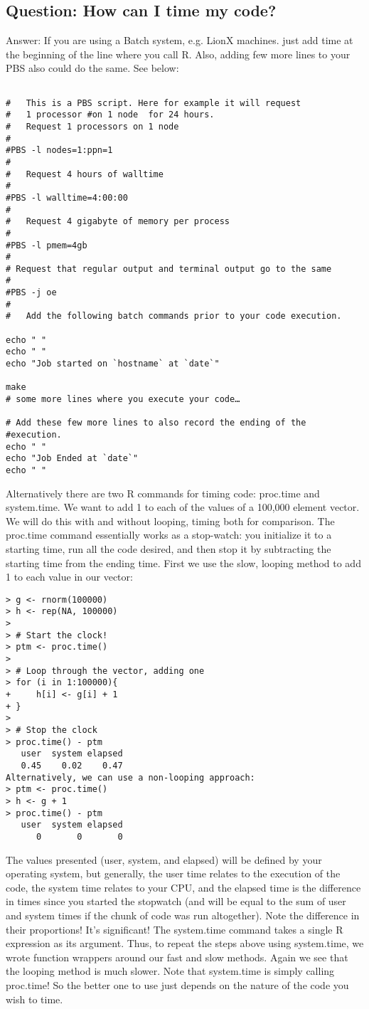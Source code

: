 \documentclass[12pt]{article}
\begin{document}
\subsection{Question: How can I time my code?}
Answer:
If you are using a Batch system, e.g. LionX machines. just add time at the beginning of the line where you call R.
Also, adding few more lines to your PBS also could do the same. See below:

\begin{verbatim}

#   This is a PBS script. Here for example it will request 
#   1 processor #on 1 node  for 24 hours.
#   Request 1 processors on 1 node 
#   
#PBS -l nodes=1:ppn=1
#
#   Request 4 hours of walltime
#
#PBS -l walltime=4:00:00
#
#   Request 4 gigabyte of memory per process
#
#PBS -l pmem=4gb
#
# Request that regular output and terminal output go to the same    
#
#PBS -j oe
#
#   Add the following batch commands prior to your code execution.     

echo " "
echo " "
echo "Job started on `hostname` at `date`"

make
# some more lines where you execute your code…

# Add these few more lines to also record the ending of the
#execution.
echo " "
echo "Job Ended at `date`"
echo " "
\end{verbatim}

Alternatively there are two R commands for timing code: proc.time and system.time. We want to add 1 to each of the values of a 100,000 element vector. We will do this with and without looping, timing both for comparison.
The proc.time command essentially works as a stop-watch: you initialize it to a starting time, run all the code desired, and then stop it by subtracting the starting time from the ending time.
First we use the slow, looping method to add 1 to each value in our vector:
\begin{verbatim}
> g <- rnorm(100000)
> h <- rep(NA, 100000)
> 
> # Start the clock!
> ptm <- proc.time()
> 
> # Loop through the vector, adding one
> for (i in 1:100000){
+     h[i] <- g[i] + 1
+ }
> 
> # Stop the clock
> proc.time() - ptm
   user  system elapsed 
   0.45    0.02    0.47 
Alternatively, we can use a non-looping approach:
> ptm <- proc.time()
> h <- g + 1
> proc.time() - ptm
   user  system elapsed 
      0       0       0 
\end{verbatim}


The values presented (user, system, and elapsed) will be defined by your operating system, but generally, the user time relates to the execution of the code, the system time relates to your CPU, and the elapsed time is the difference in times since you started the stopwatch (and will be equal to the sum of user and system times if the chunk of code was run altogether). Note the difference in their proportions! It’s significant!
The system.time command takes a single R expression as its argument. Thus, to repeat the steps above using system.time, we wrote function wrappers around our fast and slow methods. Again we see that the looping method is much slower. Note that system.time is simply calling proc.time! So the better one to use just depends on the nature of the code you wish to time.\\
\end{document}
